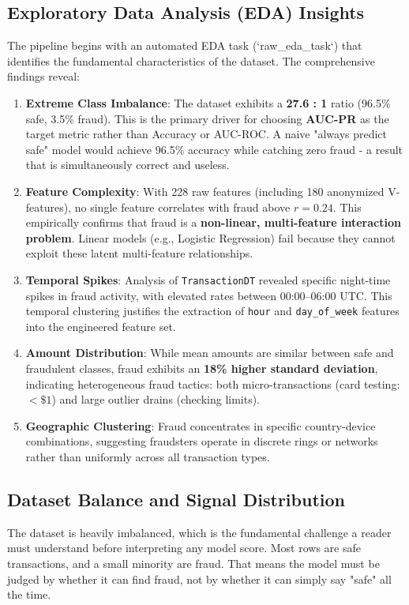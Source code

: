 \documentclass[10pt,journal,compsoc,twocolumn]{IEEEtran}
\begin{document}
\subsection{Exploratory Data Analysis (EDA) Insights}
The pipeline begins with an automated EDA task (`raw\_eda\_task`) that identifies the fundamental characteristics of the dataset. The comprehensive findings reveal:

\begin{enumerate}
 \item \textbf{Extreme Class Imbalance}: The dataset exhibits a \textbf{27.6 : 1} ratio (96.5\% safe, 3.5\% fraud). This is the primary driver for choosing \textbf{AUC-PR} as the target metric rather than Accuracy or AUC-ROC. A naive "always predict safe" model would achieve 96.5\% accuracy while catching zero fraud - a result that is simultaneously correct and useless.
 
 \item \textbf{Feature Complexity}: With 228 raw features (including 180 anonymized V-features), no single feature correlates with fraud above $r = 0.24$. This empirically confirms that fraud is a \textbf{non-linear, multi-feature interaction problem}. Linear models (e.g., Logistic Regression) fail because they cannot exploit these latent multi-feature relationships.
 
 \item \textbf{Temporal Spikes}: Analysis of \texttt{TransactionDT} revealed specific night-time spikes in fraud activity, with elevated rates between 00:00--06:00 UTC. This temporal clustering justifies the extraction of \texttt{hour} and \texttt{day\_of\_week} features into the engineered feature set.
 
 \item \textbf{Amount Distribution}: While mean amounts are similar between safe and fraudulent classes, fraud exhibits an \textbf{18\% higher standard deviation}, indicating heterogeneous fraud tactics: both micro-transactions (card testing: $<\$1$) and large outlier drains (checking limits).
 
 \item \textbf{Geographic Clustering}: Fraud concentrates in specific country-device combinations, suggesting fraudsters operate in discrete rings or networks rather than uniformly across all transaction types.
\end{enumerate}

\subsection{Dataset Balance and Signal Distribution}
The dataset is heavily imbalanced, which is the fundamental challenge a reader must understand before interpreting any model score. Most rows are safe transactions, and a small minority are fraud. That means the model must be judged by whether it can find fraud, not by whether it can simply say "safe" all the time.
\end{document}
